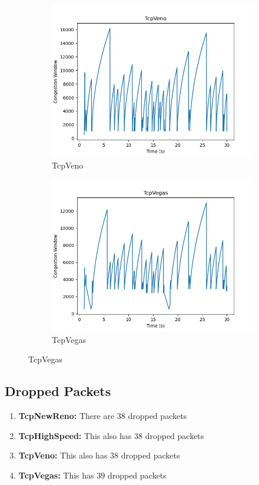 \documentclass[11pt]{article}
\begin{document}
\begin{figure}[H]
  \begin{subfigure}{0.5\textwidth}
    \centering
    \includegraphics[width=0.9\linewidth]{Q1/outputs/TcpVeno.png}
    \caption{TcpVeno}
  \end{subfigure}
  \begin{subfigure}{0.5\textwidth}
    \centering
    \includegraphics[width=0.9\linewidth]{Q1/outputs/TcpVegas.png}
    \caption{TcpVegas}
  \end{subfigure}
\end{figure}

\subsection{Dropped Packets}
\begin{enumerate}
  \item \textbf{TcpNewReno:} There are $38$ dropped packets
  \item \textbf{TcpHighSpeed:} This also has $38$ dropped packets
  \item \textbf{TcpVeno:} This also has $38$ dropped packets
  \item \textbf{TcpVegas:} This has $39$ dropped packets
\end{enumerate}
\end{document}
